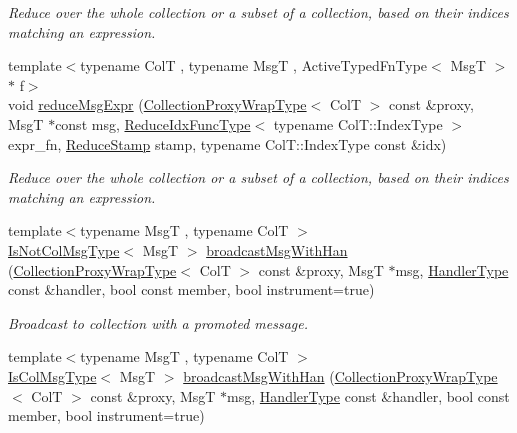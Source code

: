 \begin{DoxyCompactItemize}
\begin{DoxyCompactList}\small\item\em Reduce over the whole collection or a subset of a collection, based on their indices matching an expression. \end{DoxyCompactList}\item 
{\footnotesize template$<$typename ColT , typename MsgT , Active\+Typed\+Fn\+Type$<$ Msg\+T $>$ $\ast$ f$>$ }\\void \hyperlink{structvt_1_1vrt_1_1collection_1_1_collection_manager_a87722c8684a18b89d7c4854fe4f60ae3}{reduce\+Msg\+Expr} (\hyperlink{structvt_1_1vrt_1_1collection_1_1_collection_manager_a56458ed7f9bb22b631b9b3a745f42f94}{Collection\+Proxy\+Wrap\+Type}$<$ ColT $>$ const \&proxy, MsgT $\ast$const msg, \hyperlink{structvt_1_1vrt_1_1collection_1_1_collection_manager_a47a3227ae0195c15187e8dc8762f66c4}{Reduce\+Idx\+Func\+Type}$<$ typename Col\+T\+::\+Index\+Type $>$ expr\+\_\+fn, \hyperlink{structvt_1_1vrt_1_1collection_1_1_collection_manager_ae8aac19e0ae07e9225142e5880eac830}{Reduce\+Stamp} stamp, typename Col\+T\+::\+Index\+Type const \&idx)
\begin{DoxyCompactList}\small\item\em Reduce over the whole collection or a subset of a collection, based on their indices matching an expression. \end{DoxyCompactList}\item 
{\footnotesize template$<$typename MsgT , typename ColT $>$ }\\\hyperlink{structvt_1_1vrt_1_1collection_1_1_collection_manager_ae376deeefd4f89a0b1c93849977715d9}{Is\+Not\+Col\+Msg\+Type}$<$ MsgT $>$ \hyperlink{structvt_1_1vrt_1_1collection_1_1_collection_manager_aa4f27486773ea5bec481099223ab12d1}{broadcast\+Msg\+With\+Han} (\hyperlink{structvt_1_1vrt_1_1collection_1_1_collection_manager_a56458ed7f9bb22b631b9b3a745f42f94}{Collection\+Proxy\+Wrap\+Type}$<$ ColT $>$ const \&proxy, MsgT $\ast$msg, \hyperlink{namespacevt_af64846b57dfcaf104da3ef6967917573}{Handler\+Type} const \&handler, bool const member, bool instrument=true)
\begin{DoxyCompactList}\small\item\em Broadcast to collection with a promoted message. \end{DoxyCompactList}\item 
{\footnotesize template$<$typename MsgT , typename ColT $>$ }\\\hyperlink{structvt_1_1vrt_1_1collection_1_1_collection_manager_a21c21612c806016788057aeab142af20}{Is\+Col\+Msg\+Type}$<$ MsgT $>$ \hyperlink{structvt_1_1vrt_1_1collection_1_1_collection_manager_a737913f12b46ddaacf64a699c56c1787}{broadcast\+Msg\+With\+Han} (\hyperlink{structvt_1_1vrt_1_1collection_1_1_collection_manager_a56458ed7f9bb22b631b9b3a745f42f94}{Collection\+Proxy\+Wrap\+Type}$<$ ColT $>$ const \&proxy, MsgT $\ast$msg, \hyperlink{namespacevt_af64846b57dfcaf104da3ef6967917573}{Handler\+Type} const \&handler, bool const member, bool instrument=true)

\end{DoxyCompactItemize}
